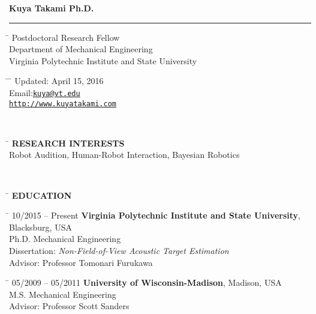 \documentclass[11pt,letter]{article}
\begin{document}
{\bf \huge \noindent Kuya Takami Ph.D.}\vspace{-2mm}\\
\rule{\textwidth}{1.7pt}

\parbox{0.4\textwidth}{ %
\begin{tabbing} %
		\hspace{1cm} \= \kill %
		 \> Postdoctoral Research Fellow\\ %
		\> Department of Mechanical Engineering \\
		 \>  Virginia Polytechnic Institute and State University
\end{tabbing}}
\hfill %
\parbox{0.4\textwidth}{ %
	\begin{tabbing} %
		\hspace{1cm} \= \hspace{4cm} \= \kill %
		\> Updated: April 15, 2016 \\ %
		\> Email:\href{mailto:kuya@vt.edu}{\tt kuya@vt.edu}  \\ %
		\> \href{http://www.kuyatakami.com}{\tt http://www.kuyatakami.com}
	\end{tabbing}
}\\
\parbox{0.7\textwidth}{
\begin{tabbing}
	\hspace{1cm} \= \kill
	\>	{\bf \MakeUppercase{Research Interests}}\\
	\>	Robot Audition, Human-Robot Interaction, Bayesian Robotics
\end{tabbing}
}
\\
\vspace{-5mm}
\begin{tabbing}
	\hspace{2cm}\=\kill
	\>  {\bf \Large EDUCATION}
\end{tabbing}
\begin{tabbing}
	\hspace{3cm} \= \kill
	{\footnotesize 10/2015 -- Present} \> {\bf Virginia Polytechnic Institute and State University}, Blacksburg, USA\\
	\> Ph.D.  Mechanical Engineering \\
	\> Dissertation: {\it Non-Field-of-View Acoustic Target Estimation}\\
	\> Advisor: Professor Tomonari Furukawa
\end{tabbing}
\begin{tabbing}
	\hspace{3cm} \= \kill
	{\footnotesize 05/2009 -- 05/2011} \> {\bf University of Wisconsin-Madison}, Madison, USA\\
	\> M.S.  Mechanical Engineering \\
	\> Advisor: Professor Scott Sanders
\end{tabbing}
\end{document}
